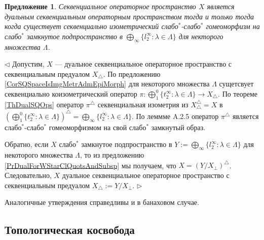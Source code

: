 \documentclass[12pt]{article}
\newtheorem{proposition}[theorem]{Предложение}
\newenvironment{proof}{\par $\triangleleft$}{$\triangleright$}
\begin{document}
\begin{proposition}\label{PrCharacDualSQSp} Секвенциальное операторное пространство $X$ является дуальным секвенциальным операторным пространством тогда и только тогда когда существует секвенциально изометрический слабо${}^*$-слабо${}^*$ гомеоморфизм на слабо${}^*$ замкнутое подпространство в $\bigoplus_\infty\{l_2^\infty:\lambda\in\Lambda\}$  для некторого множества $\Lambda$.
\end{proposition}
\begin{proof}
Допустим, $X$ --- дуальное секвенциальное операторное пространство с секвенциальным предуалом $X_\triangle$. По предложению \ref{CorSQSpaceIsImgMetrAdmEpiMorph} для некоторого множества $\Lambda$ сущетсвует секвенциально коизометрический оператор $\pi:\bigoplus_1^0\{t_2^\infty:\lambda\in\Lambda\}\to X_\triangle$. По теореме \ref{ThDualSQOps} оператор $\pi^\triangle$ секвенциальная изометрия из $X_\triangle^\triangle=X$ в $(\bigoplus_1^0\{t_2^\infty:\lambda\in\Lambda\})^\triangle=\bigoplus_\infty\{l_2^\infty:\lambda\in\Lambda\}$. По леммме A.2.5 \cite{BleOpAlgAndMods} оператор $\pi^\triangle$ является слабо${}^*$-слабо${}^*$ гомеоморфизмом на свой слабо${}^*$ замкнутый образ.

Обратно, если $X$ слабо${}^*$ замкнутое подпространство в $Y:=\bigoplus_\infty\{l_2^\infty:\lambda\in\Lambda\}$ для некоторого множества $\Lambda$, то из предложению \ref{PrDualForWStarClQuotsAndSubsp} мы получаем, что $X=(Y/X_\perp)^\triangle$. Следовательно, $X$ дуальное секвенциальное операторное пространство с секвенциальным предуалом $X_\triangle:=Y/X_\perp$.
\end{proof}

Аналогичные утверждения справедливы и в банаховом случае.






























\subsection{Топологическая косвобода}
\end{document}
